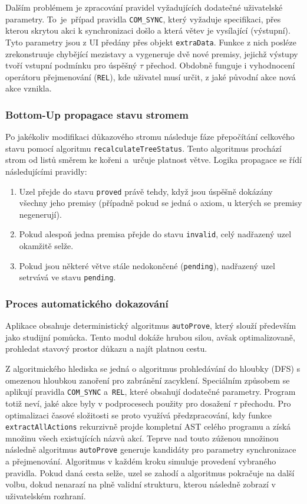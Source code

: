 Dalším problémem je zpracování pravidel vyžadujících dodatečné uživatelské parametry. 
To~je~případ pravidla \texttt{COM\_SYNC}, který vyžaduje specifikaci, přes kterou skrytou akci k synchronizaci došlo a která větev je vysílající (výstupní). 
Tyto parametry jsou z UI předány přes objekt \texttt{extraData}. 
Funkce z nich posléze zrekonstruuje chybějící mezistavy a vygeneruje dvě nové premisy, jejichž výstupy tvoří vstupní podmínku pro úspěšný $\tau$ přechod. 
Obdobně funguje i vyhodnocení operátoru přejmenování (\texttt{REL}), kde uživatel musí určit, z jaké původní akce nová akce vznikla.

\subsubsection*{Bottom-Up propagace stavu stromem}
Po jakékoliv modifikaci důkazového stromu následuje fáze přepočítání celkového stavu pomocí algoritmu \texttt{recalculateTreeStatus}. 
Tento algoritmus prochází strom od listů směrem ke kořeni a~určuje platnost větve. 
Logika propagace se řídí následujícími pravidly:
\begin{enumerate}
    \item Uzel přejde do stavu \texttt{proved} právě tehdy, když jsou úspěšně dokázány všechny jeho premisy (případně pokud se jedná o axiom, u kterých se premisy negenerují).
    \item Pokud alespoň jedna premisa přejde do stavu \texttt{invalid}, celý nadřazený uzel okamžitě selže.
    \item Pokud jsou některé větve stále nedokončené (\texttt{pending}), nadřazený uzel setrvává ve stavu \texttt{pending}.
\end{enumerate}

\subsubsection*{Proces automatického dokazování}
Aplikace obsahuje deterministický algoritmus \texttt{autoProve}, který slouží především jako studijní pomůcka. 
Tento modul dokáže hrubou silou, avšak optimalizovaně, prohledat stavový prostor důkazu a najít platnou cestu. 

Z algoritmického hlediska se jedná o algoritmus prohledávání do hloubky (DFS) s omezenou hloubkou zanoření pro zabránění zacyklení. 
Speciálním způsobem se aplikují pravidla \texttt{COM\_SYNC} a~\texttt{REL}, které obsahují dodatečné parametry.
Program totiž neví, jaké akce byly v podprocesech použity pro dosažení $\tau$ přechodu. 
Pro optimalizaci časové složitosti se proto využívá předzpracování, kdy funkce \texttt{extractAllActions} rekurzivně projde kompletní AST celého programu a získá množinu všech existujících názvů akcí. 
Teprve nad touto zúženou množinou následně algoritmus \texttt{autoProve} generuje kandidáty pro parametry synchronizace a přejmenování.
Algoritmus v každém kroku simuluje provedení vybraného pravidla. 
Pokud daná cesta selže, uzel se zahodí a algoritmus pokračuje na další volbu, dokud nenarazí na plně validní strukturu, kterou následně zobrazí v uživatelském rozhraní.

